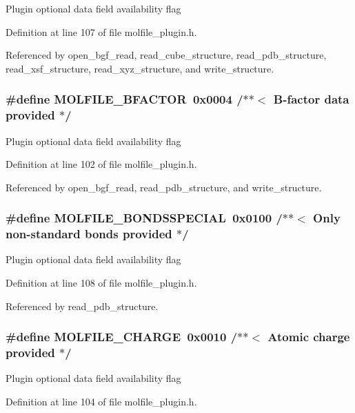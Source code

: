 Plugin optional data field availability flag 

Definition at line 107 of file molfile\_\-plugin.h.

Referenced by open\_\-bgf\_\-read, read\_\-cube\_\-structure, read\_\-pdb\_\-structure, read\_\-xsf\_\-structure, read\_\-xyz\_\-structure, and write\_\-structure.
\subsubsection{\setlength{\rightskip}{0pt plus 5cm}\#define MOLFILE\_\-BFACTOR\ 0x0004 /$\ast$$\ast$$<$ B-factor data provided           $\ast$/}\label{molfile__plugin_8h_a11}


Plugin optional data field availability flag 

Definition at line 102 of file molfile\_\-plugin.h.

Referenced by open\_\-bgf\_\-read, read\_\-pdb\_\-structure, and write\_\-structure.
\subsubsection{\setlength{\rightskip}{0pt plus 5cm}\#define MOLFILE\_\-BONDSSPECIAL\ 0x0100 /$\ast$$\ast$$<$ Only non-standard bonds provided $\ast$/}\label{molfile__plugin_8h_a17}


Plugin optional data field availability flag 

Definition at line 108 of file molfile\_\-plugin.h.

Referenced by read\_\-pdb\_\-structure.
\subsubsection{\setlength{\rightskip}{0pt plus 5cm}\#define MOLFILE\_\-CHARGE\ 0x0010 /$\ast$$\ast$$<$ Atomic charge provided           $\ast$/}\label{molfile__plugin_8h_a13}


Plugin optional data field availability flag 

Definition at line 104 of file molfile\_\-plugin.h.

